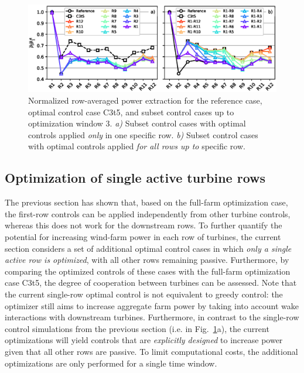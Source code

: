 \documentclass[wes, manuscript]{copernicus}
\begin{document}
\begin{figure}
	\includegraphics[width=\textwidth]{multirow.eps}
	\caption{Normalized row-averaged power extraction for the reference case, optimal control case C3t5, and subset control cases up to optimization window 3. \emph{a)} Subset control cases with optimal controls applied \emph{only} in one specific row. \emph{b)} Subset control cases with optimal controls applied \emph{for all rows up to} specific row. \label{fig:multirow}}
\end{figure}

\subsection{Optimization of single active turbine rows}\label{sec:optimization_single}
The previous section has shown that, based on the full-farm optimization case, the first-row controls can be applied independently from other turbine controls, whereas this does not work for the downstream rows. To further quantify the potential for increasing wind-farm power in each row of turbines, the current section considers a set of additional optimal control cases in which \emph{only a single active row is optimized}, with all other rows remaining passive. Furthermore, by comparing the optimized controls of these cases with the full-farm optimization case C3t5, the degree of cooperation between turbines can be assessed. Note that the current single-row optimal control is not equivalent to greedy control: the optimizer still aims to increase aggregate farm power by taking into account wake interactions with downstream turbines. Furthermore, in contrast to the single-row control simulations from the previous section (i.e. in Fig.~\ref{fig:multirow}a), the current optimizations will yield controls that are \emph{explicitly designed} to increase power given that all other rows are passive. To limit computational costs, the additional optimizations are only performed for a single time window. 
\end{document}
